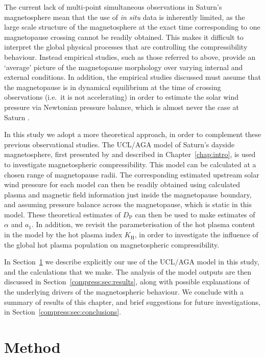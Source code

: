 The current lack of multi-point simultaneous observations in Saturn's magnetosphere mean that the use of \textit{in situ} data is inherently limited, as the large scale structure of the magnetosphere at the exact time corresponding to one magnetopause crossing cannot be readily obtained. This makes it difficult to interpret the global physical processes that are controlling the compressibility behaviour. Instead empirical studies, such as those referred to above, provide an `average' picture of the magnetopause morphology over varying internal and external conditions. In addition, the empirical studies discussed must assume that the magnetopause is in dynamical equilibrium at the time of crossing observations (i.e.\ it is not accelerating) in order to estimate the solar wind pressure via Newtonian pressure balance, which is almost never the case at Saturn \cite[e.g.][]{dougherty2005,masters2011,pilkington2015}.

In this study we adopt a more theoretical approach, in order to complement these previous observational studies. The UCL/AGA model of Saturn's dayside magnetosphere, first presented by \citet{achilleos2010a} and described in Chapter~\ref{chap:intro}, is used to investigate magnetospheric compressibility. This model can be calculated at a chosen range of magnetopause radii. The corresponding estimated upstream solar wind pressure for each model can then be readily obtained using calculated plasma and magnetic field information just inside the magnetopause boundary, and assuming pressure balance across the magnetopause, which is static in this model. These theoretical estimates of $D_\mathrm{P}$ can then be used to make estimates of $\alpha$ and $a_1$. In addition, we revisit the parameterisation of the hot plasma content in the model by the hot plasma index $K_\mathrm{H}$, in order to investigate the influence of the global hot plasma population on magnetospheric compressibility.

In Section~\ref{compress:sec:method} we describe explicitly our use of the UCL/AGA model in this study, and the calculations that we make. The analysis of the model outputs are then discussed in Section~\ref{compress:sec:results}, along with possible explanations of the underlying drivers of the magnetospheric behaviour. We conclude with a summary of results of this chapter, and brief suggestions for future investigations, in Section~\ref{compress:sec:conclusions}.

\section{Method}\label{compress:sec:method}

